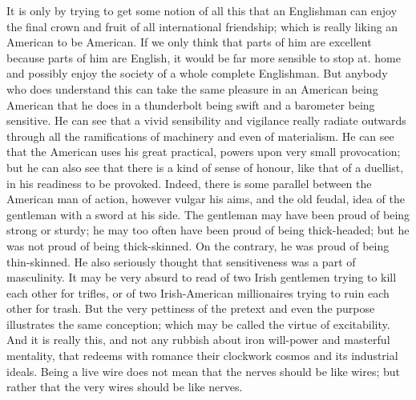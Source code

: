 \documentclass{book}
\begin{document}
It is only by trying to get some notion of all this that an Englishman can enjoy the final crown and fruit of all international friendship; which is really liking an American to be American. If we only think that parts of him are excellent because parts of him are English, it would be far more sensible to stop at. home and possibly enjoy the society of a whole complete Englishman. But anybody who does understand this can take the same pleasure in an American being American that he does in a thunderbolt being swift and a barometer being sensitive. He can see that a vivid sensibility and vigilance really radiate outwards through all the ramifications of machinery and even of materialism. He can see that the American uses his great practical, powers upon very small provocation; but he can also see that there is a kind of sense of honour, like that of a duellist, in his readiness to be provoked. Indeed, there is some parallel between the American man of action, however vulgar his aims, and the old feudal, idea of the gentleman with a sword at his side. The gentleman may have been proud of being strong or sturdy; he may too often have been proud of being thick-headed; but he was not proud of being thick-skinned. On the contrary, he was proud of being thin-skinned. He also seriously thought that sensitiveness was a part of masculinity. It may be very absurd to read of two Irish gentlemen trying to kill each other for trifles, or of two Irish-American millionaires trying to ruin each other for trash. But the very pettiness of the pretext and even the purpose illustrates the same conception; which may be called the virtue of excitability. And it is really this, and not any rubbish about iron will-power and masterful mentality, that redeems with romance their clockwork cosmos and its industrial ideals. Being a live wire does not mean that the nerves should be like wires; but rather that the very wires should be like nerves.
\end{document}
